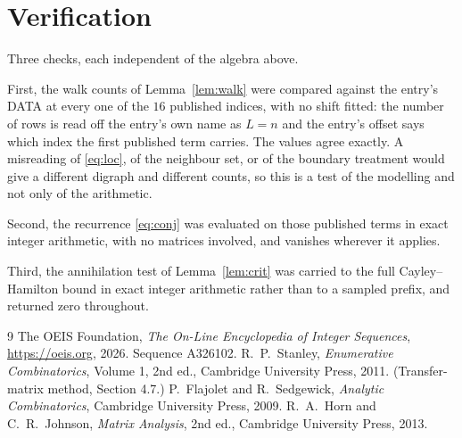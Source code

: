 \documentclass[11pt,a4paper]{article}
\theoremstyle{plain}
\theoremstyle{definition}
\begin{document}
\section{Verification}

Three checks, each independent of the algebra above.

First, the walk counts of Lemma~\ref{lem:walk} were compared against the entry's DATA at
every one of the $16$ published indices, with no shift fitted: the number of rows is
read off the entry's own name as $L=n$ and the entry's offset says which index the first
published term carries. The values agree exactly. A misreading of \eqref{eq:loc}, of the
neighbour set, or of the boundary treatment would give a different digraph and different
counts, so this is a test of the modelling and not only of the arithmetic.

Second, the recurrence \eqref{eq:conj} was evaluated on those published terms in exact
integer arithmetic, with no matrices involved, and vanishes wherever it applies.

Third, the annihilation test of Lemma~\ref{lem:crit} was carried to the full
Cayley--Hamilton bound in exact integer arithmetic rather than to a sampled prefix, and
returned zero throughout.

\begin{thebibliography}{9}
 The OEIS Foundation, \emph{The On-Line Encyclopedia of Integer
Sequences}, \url{https://oeis.org}, 2026. Sequence A326102.
 R.~P.~Stanley, \emph{Enumerative Combinatorics}, Volume 1, 2nd ed.,
Cambridge University Press, 2011. (Transfer-matrix method, Section 4.7.)
 P.~Flajolet and R.~Sedgewick, \emph{Analytic Combinatorics}, Cambridge
University Press, 2009.
 R.~A.~Horn and C.~R.~Johnson, \emph{Matrix Analysis}, 2nd ed., Cambridge
University Press, 2013.
\end{thebibliography}
\end{document}
